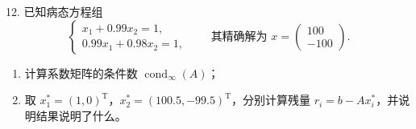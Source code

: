 \documentclass[11pt, a4paper]{ctexart}
\begin{document}
\begin{problem}{12. 已知病态方程组}
    \[
        \begin{cases}
            x_1 + 0.99x_2 = 1, \\
            0.99x_1 + 0.98x_2 = 1,
        \end{cases}
        \qquad
        \text{其精确解为 }
        x =
        \begin{pmatrix}
            100 \\
            -100
        \end{pmatrix}.
    \]
    \begin{enumerate}[1.]
        \item 计算系数矩阵的条件数 $\operatorname{cond}_{\infty}(A)$；
        \item 取 $x_1^* = (1, 0)^{\mathrm{T}}$，$x_2^* = (100.5, -99.5)^{\mathrm{T}}$，分别计算残量 $r_i = b - Ax_i^*$，并说明结果说明了什么。
    \end{enumerate}
\end{problem}
\end{document}
